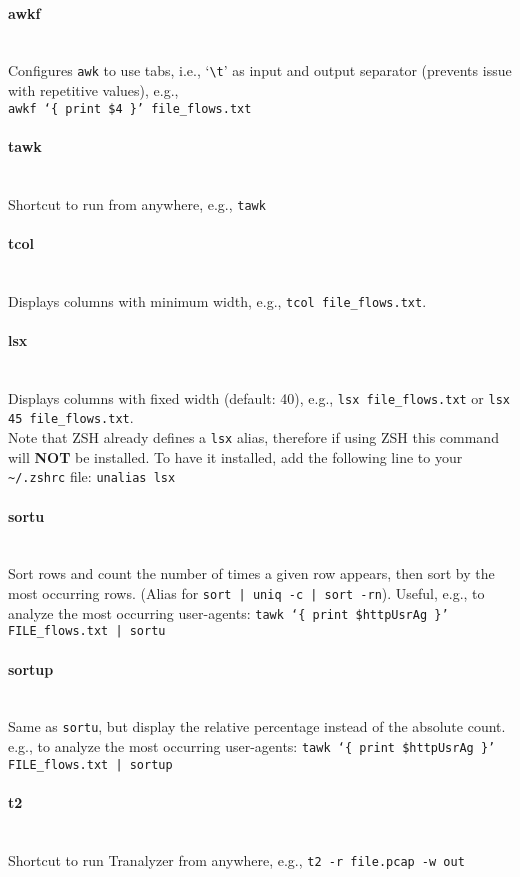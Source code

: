 \documentclass[documentation]{subfiles}
\begin{document}
\paragraph{awkf}~\\
Configures {\tt awk} to use tabs, i.e., `{\tt\textbackslash{}t}' as input and output separator (prevents issue with repetitive values), e.g.,\\
{\tt awkf `\{ print \$4 \}' file\_flows.txt}
\paragraph{tawk}~\\
Shortcut to run  from anywhere, e.g., {\tt tawk}
\paragraph{tcol}~\\
Displays columns with minimum width, e.g., {\tt tcol file\_flows.txt}.
\paragraph{lsx}~\\
Displays columns with fixed width (default: 40), e.g., {\tt lsx file\_flows.txt} or {\tt lsx 45 file\_flows.txt}.\\
Note that ZSH already defines a {\tt lsx} alias, therefore if using ZSH this command will {\bf NOT} be installed.
To have it installed, add the following line to your {\tt \textasciitilde{}/.zshrc} file: {\tt unalias lsx}
\paragraph{sortu}~\\
Sort rows and count the number of times a given row appears, then sort by the most occurring rows.
(Alias for {\tt sort | uniq -c | sort -rn}).
Useful, e.g., to analyze the most occurring user-agents: {\tt tawk `\{ print \$httpUsrAg \}' FILE\_flows.txt | sortu}
\paragraph{sortup}~\\
Same as {\tt sortu}, but display the relative percentage instead of the absolute count.
e.g., to analyze the most occurring user-agents: {\tt tawk `\{ print \$httpUsrAg \}' FILE\_flows.txt | sortup}
\paragraph{t2}~\\
Shortcut to run Tranalyzer from anywhere, e.g., {\tt t2 -r file.pcap -w out}
\end{document}
